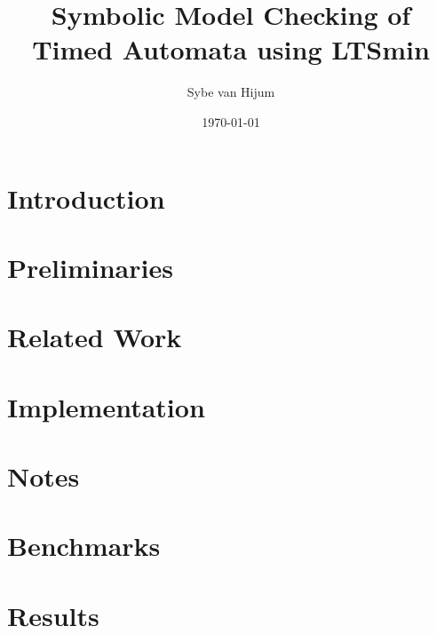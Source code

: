 \documentclass[11pt,a4paper]{article}
\newcommand{\ltsmin}{LTSmin}
\begin{document}
\newtheorem{mydef}{Definition}
\newtheorem{myconjecture}{Conjecture}
\title{Symbolic Model Checking of Timed Automata using \ltsmin{}}
\author{Sybe van Hijum}
\date{\today{}}
\maketitle

\clearpage
\tableofcontents

\clearpage
\section{Introduction}


%

\clearpage
\section{Preliminaries}


\clearpage
\section{Related Work}


\clearpage
\section{Implementation}


%

\clearpage
\section{Notes}


\clearpage
\section{Benchmarks}


\clearpage
\section{Results}


\clearpage
{}

\end{document}
